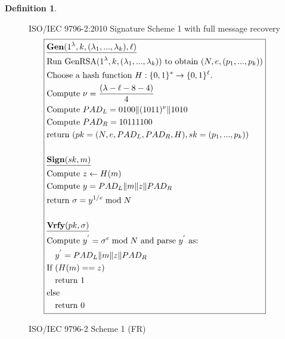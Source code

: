 \documentclass[]{final_report}
\theoremstyle{definition}
\newtheorem{definition}{Definition}[chapter]
\begin{document}
\begin{definition}
\begin{figure}[H]
\centering
\hfill ISO/IEC 9796-2:2010 Signature Scheme 1 with full message recovery\hfill\phantom{} 
\[
\boxed{
\begin{aligned}
&\underline{\textbf{\text{Gen}} (1^\lambda, k, (\lambda_{1},...,\lambda_{k}), \ell)} \\
&\text{Run GenRSA}(1^\lambda, k, (\lambda_{1},...,\lambda_{k})) \text{ to obtain } (N, e, (p_{1},...,p_{k})) \\
&\text{Choose a hash function } H : \{0, 1\}^* \rightarrow \{0, 1\}^\ell. \\
&\text{Compute } \nu = \frac{(\lambda - \ell - 8 - 4)}{4} \\
&\text{Compute } PAD_{L} = 0100 \| (1011)^{\nu} \| 1010 \\
&\text{Compute } PAD_{R} = 10111100 \\
&\text{return } (pk = (N, e, PAD_{L}, PAD_{R}, H), sk = (p_{1},...,p_{k})) \\
\\
&\underline{\textbf{\text{Sign}} (sk, m)} \\
&\text{Compute } z \leftarrow H(m) \\
&\text{Compute } y = PAD_{L} \| m \| z \| PAD_{R} \\
&\text{return } \sigma = y^{1/e} \bmod N \\
\\
&\underline{\textbf{\text{Vrfy}} (pk, \sigma)} \\
&\text{Compute } y^{'} = \sigma^{e} \bmod N \text{ and parse } y^{'} \text{ as: } \\
&\quad y^{'} = PAD_{L} \| m \| z \| PAD_{R} \\
&\text{If } (H(m) == z) \\
&\quad \text{return } 1 \\
&\text{else} \\
&\quad \text{return } 0 
\end{aligned}
}
\]
\caption{ISO/IEC 9796-2 Scheme 1 (FR)}
\label{fig:isoiec9796-full}
\end{figure}
\end{definition}
\end{document}
